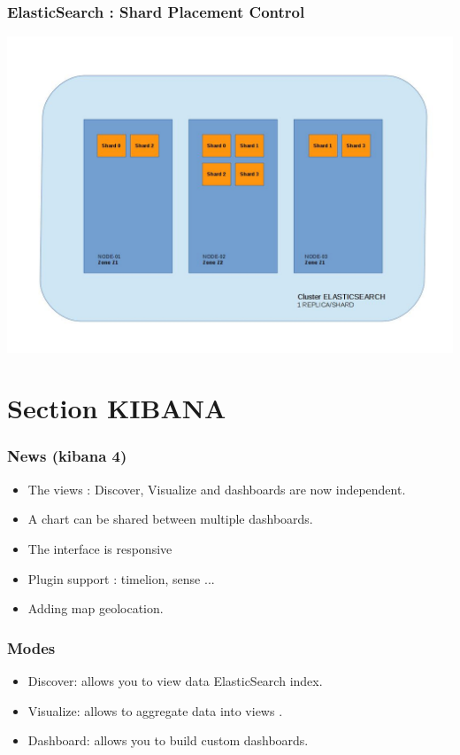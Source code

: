 \documentclass{beamer}
\begin{document}
%
\begin{frame}
\frametitle{ElasticSearch : Shard Placement Control}
\centering
\includegraphics[scale=0.28]{img/elk_zone.jpg}
\end{frame}
%
\section{Section KIBANA}
% 
\begin{frame}
\frametitle{News (kibana 4)}
\begin{itemize}
\item The views : Discover, Visualize and dashboards are now independent.
\item A chart can be shared between multiple dashboards.
\item The interface is responsive
\item Plugin support : timelion, sense ...
\item Adding map geolocation.
\end{itemize}
\end{frame}
%
\begin{frame}
\frametitle{Modes}
\begin{itemize}
\item Discover: allows you to view data ElasticSearch index.
\item Visualize: allows to aggregate data into views .
\item Dashboard: allows you to build custom dashboards.
\end{itemize}
\end{frame}
\end{document}
